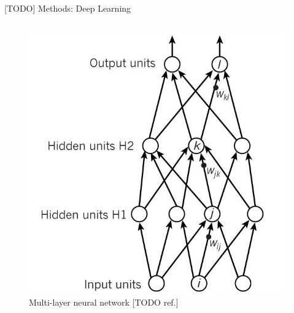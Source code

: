 \documentclass[final,hyperref={pdfpagelabels=false}]{beamer}
\begin{document}
\begin{frame}[t]
\begin{columns}[t]
\begin{column}{.465\textwidth}
\begin{block}{[TODO] Methods: Deep Learning}
\begin{columns}
\begin{column}{.4\textwidth}
\begin{figure}
\includegraphics[width=.9\linewidth]{nature-deep-learning/fig_1c}
\caption{Multi-layer neural network [TODO ref.]}
\end{figure}
\end{column}
\end{columns} %


\end{block}
\end{column}
\end{columns}
\end{frame}
\end{document}
